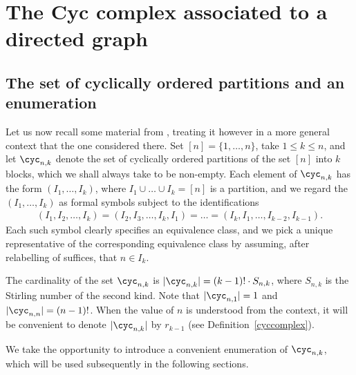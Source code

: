 \section{The Cyc complex associated to a directed graph}

\subsection{The set of cyclically ordered partitions and an 
enumeration}\label{thesetcyc}

 Let us now recall some material from \cite[Section~2]{ms},
treating it however in a more general context that the one considered
there. Set $[n]=\{1,\ldots ,n\}$, take $1\leq k\leq n$, and let
$\cyc_{n,k}$ denote the set of cyclically ordered partitions of the
set $[n]$ into $k$ blocks, which we shall always take to be
non-empty. Each element of $\cyc_{n,k}$ has the form $(I_1,\ldots
,I_k)$, where $I_1\cup\ldots\cup I_k=[n]$ is a partition, and we
regard the $(I_1,\ldots ,I_k)$ as formal symbols subject to the
identifications
\begin{eqnarray*}
(I_1,I_2,\ldots ,I_k)=(I_2,I_3,\ldots
  ,I_k,I_1)=\ldots=(I_k,I_1,\ldots,I_{k-2},I_{k-1}).
\end{eqnarray*}
Each such symbol clearly specifies an equivalence class, and we pick a
unique representative of the corresponding equivalence class by
assuming, after relabelling of suffices, that $n\in I_k$.

The cardinality of the set $\cyc_{n,k}$ is $\lvert
\cyc_{n,k}\rvert=(k-1)!\cdot S_{n,k}$, where $S_{n,k}$ is the Stirling
number of the second kind. Note that $\lvert \cyc_{n,1}\rvert=1$ and
$\lvert \cyc_{n,n}\rvert=(n-1)!$. When the value of $n$ is understood
from the context, it will be convenient to denote
$\lvert\cyc_{n,k}\rvert$ by $r_{k-1}$ (see
Definition~\ref{cyccomplex}).

We take the opportunity to introduce a convenient enumeration of
$\cyc_{n,k}$, which will be used subsequently in the following
sections.

